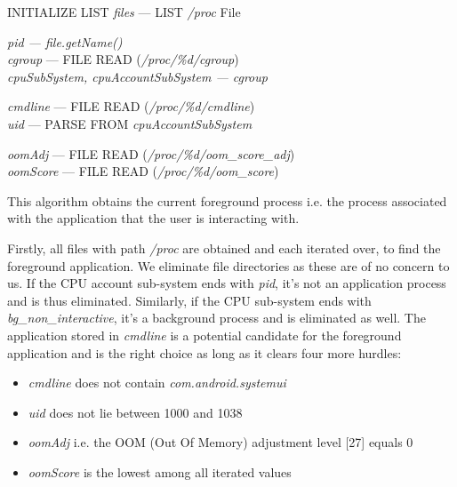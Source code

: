 \documentclass[12pt]{uthesis-v12}  %
\begin{document}
			\begin{algorithm}[H]
				\SetAlgoLined
				
				INITIALIZE LIST {\em files} --- LIST {\em /proc} File\\
				{
					
					{\em pid --- file.getName()}\\
					{\em cgroup} --- FILE READ ({\em /proc/\%d/cgroup})\\
					{\em cpuSubSystem, cpuAccountSubSystem --- cgroup}\\
					
					
					{\em cmdline} --- FILE READ ({\em /proc/\%d/cmdline})\\
					{\em uid} --- PARSE FROM {\em cpuAccountSubSystem}\\
					
					
					{\em oomAdj} --- FILE READ ({\em /proc/\%d/oom\_score\_adj})\\
					{\em oomScore} --- FILE READ ({\em /proc/\%d/oom\_score})\\
					
				}
				
				\caption[Algorithm to get current foreground application]{This algorithm obtains the current foreground process i.e. the process associated with the application that the user is interacting with.}
			\end{algorithm}
			
			Firstly, all files with path {\em /proc} are obtained and each iterated over, to find the foreground application. We eliminate file directories as these are of no concern to us. If the CPU account sub-system ends with {\em pid}, it's not an application process and is thus eliminated. Similarly, if the CPU sub-system ends with {\em bg\_non\_interactive}, it's a background process and is eliminated as well. The application stored in {\em cmdline} is a potential candidate for the foreground application and is the right choice as long as it clears four more hurdles:
			
			\begin{itemize}
				\item {\em cmdline} does not contain {\em com.android.systemui}
				\item {\em uid} does not lie between 1000 and 1038
				\item {\em oomAdj} i.e. the OOM (Out Of Memory) adjustment level [27] equals 0
				\item {\em oomScore} is the lowest among all iterated values
			\end{itemize}
			
\end{document}
